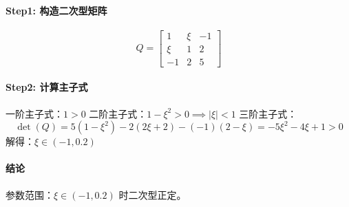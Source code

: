 \paragraph{Step1: 构造二次型矩阵}  
\[
Q = \begin{bmatrix}
1 & \xi & -1 \\
\xi & 1 & 2 \\
-1 & 2 & 5
\end{bmatrix}
\]

\paragraph{Step2: 计算主子式}  
一阶主子式：\(1 > 0\)  
二阶主子式：\(1 - \xi^2 > 0 \implies |\xi| < 1\)  
三阶主子式：  
\[
\det(Q) = 5(1 - \xi^2) - 2(2\xi + 2) - (-1)(2 - \xi) = -5\xi^2 - 4\xi + 1 > 0
\]
解得：\(\xi \in (-1, 0.2)\)

\paragraph{结论}  
参数范围：\(\xi \in (-1, 0.2)\) 时二次型正定。
